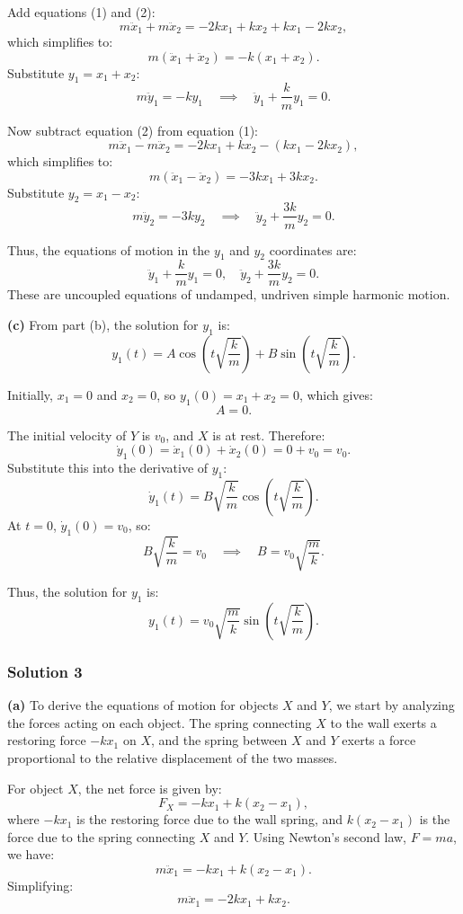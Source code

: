 \documentclass{article}
\begin{document}
Add equations (1) and (2):
\[
m \ddot{x}_1 + m \ddot{x}_2 = -2k x_1 + k x_2 + k x_1 - 2k x_2,
\]
which simplifies to:
\[
m (\ddot{x}_1 + \ddot{x}_2) = -k (x_1 + x_2).
\]
Substitute $y_1 = x_1 + x_2$:
\[
m \ddot{y}_1 = -k y_1 \quad \implies \quad \ddot{y}_1 + \frac{k}{m} y_1 = 0. \tag{3}
\]

Now subtract equation (2) from equation (1):
\[
m \ddot{x}_1 - m \ddot{x}_2 = -2k x_1 + k x_2 - (k x_1 - 2k x_2),
\]
which simplifies to:
\[
m (\ddot{x}_1 - \ddot{x}_2) = -3k x_1 + 3k x_2.
\]
Substitute $y_2 = x_1 - x_2$:
\[
m \ddot{y}_2 = -3k y_2 \quad \implies \quad \ddot{y}_2 + \frac{3k}{m} y_2 = 0. \tag{4}
\]

Thus, the equations of motion in the $y_1$ and $y_2$ coordinates are:
\[
\boxed{\ddot{y}_1 + \frac{k}{m} y_1 = 0, \quad \ddot{y}_2 + \frac{3k}{m} y_2 = 0.}
\]
These are uncoupled equations of undamped, undriven simple harmonic motion.

\textbf{(c)} From part (b), the solution for $y_1$ is:
\[
y_1(t) = A \cos\left(t \sqrt{\frac{k}{m}}\right) + B \sin\left(t \sqrt{\frac{k}{m}}\right).
\]

Initially, $x_1 = 0$ and $x_2 = 0$, so $y_1(0) = x_1 + x_2 = 0$, which gives:
\[
A = 0.
\]

The initial velocity of $Y$ is $v_0$, and $X$ is at rest. Therefore:
\[
\dot{y}_1(0) = \dot{x}_1(0) + \dot{x}_2(0) = 0 + v_0 = v_0.
\]
Substitute this into the derivative of $y_1$:
\[
\dot{y}_1(t) = B \sqrt{\frac{k}{m}} \cos\left(t \sqrt{\frac{k}{m}}\right).
\]
At $t = 0$, $\dot{y}_1(0) = v_0$, so:
\[
B \sqrt{\frac{k}{m}} = v_0 \quad \implies \quad B = v_0 \sqrt{\frac{m}{k}}.
\]

Thus, the solution for $y_1$ is:
\[
\boxed{y_1(t) = v_0 \sqrt{\frac{m}{k}} \sin\left(t \sqrt{\frac{k}{m}}\right).}
\]

\subsubsection{Solution 3}
\textbf{(a)} To derive the equations of motion for objects $X$ and $Y$, we start by analyzing the forces acting on each object. The spring connecting $X$ to the wall exerts a restoring force $-kx_1$ on $X$, and the spring between $X$ and $Y$ exerts a force proportional to the relative displacement of the two masses. 

For object $X$, the net force is given by:
\[
F_X = -kx_1 + k(x_2 - x_1),
\]
where $-kx_1$ is the restoring force due to the wall spring, and $k(x_2 - x_1)$ is the force due to the spring connecting $X$ and $Y$. Using Newton's second law, $F = ma$, we have:
\[
m\ddot{x}_1 = -kx_1 + k(x_2 - x_1).
\]
Simplifying:
\[
m\ddot{x}_1 = -2kx_1 + kx_2. \tag{1}
\]
\end{document}
